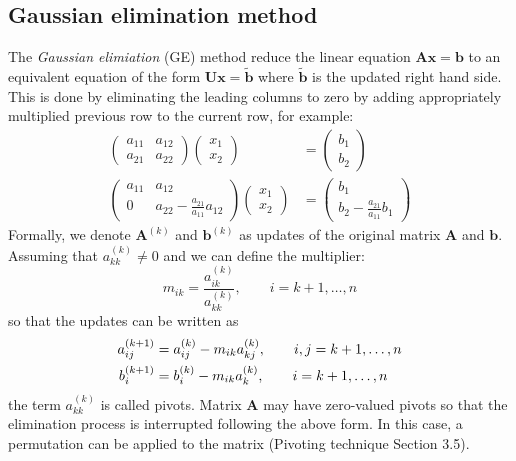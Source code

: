 \documentclass{article}
\begin{document}
\subsection{Gaussian elimination method}
The \emph{Gaussian elimiation} (GE) method reduce the linear equation 
$\mathbf{A}\mathbf{x} = \mathbf{b}$ to an equivalent equation 
of the form $\mathbf{U}\mathbf{x} = \tilde{\mathbf{b}}$ where $\tilde{\mathbf{b}}$
is the updated right hand side. 
This is done by eliminating the leading columns to zero by adding appropriately multiplied 
previous row to the current row, for example:
\begin{align*}
    \left(\begin{matrix}
        a_{11} & a_{12} \\
        a_{21} & a_{22} 
    \end{matrix}\right)
    \left(\begin{matrix}
        x_1 \\ x_2
    \end{matrix}\right) &= 
    \left(\begin{matrix}
        b_1 \\ b_2
    \end{matrix}\right) \\
    \left(\begin{matrix}
        a_{11} & a_{12} \\
        0 & a_{22} - \frac{a_{21}}{a_{11}} a_{12}
    \end{matrix}\right)
    \left(\begin{matrix}
        x_1 \\ x_2
    \end{matrix}\right) &= 
    \left(\begin{matrix}
        b_1 \\ b_2 - \frac{a_{21}}{a_{11}} b_1
    \end{matrix}\right)
\end{align*}
Formally, we denote $\mathbf{A}^{(k)}$ and $\mathbf{b}^{(k)}$ as updates of the 
original matrix $\mathbf{A}$ and $\mathbf{b}$. Assuming that $a_{kk}^{(k)}\neq 0$ and 
we can define the multiplier:
\begin{equation*}
    m_{ik} = \frac{a_{ik}^{(k)}}{a_{kk}^{(k)}} 
    ,\qquad i = k+1, \dots, n
\end{equation*}
so that the updates can be written as
\begin{align}
    a_{ij}^{(k+1)} &= a_{ij}^{(k)} - m_{ik}a_{kj}^{(k)}
    ,\qquad i,j = k+1, \dots, n \notag \\
    b_{i}^{(k+1)} &= b_{i}^{(k)} - m_{ik}a_{k}^{(k)}
    ,\qquad i = k+1, \dots, n \\
\end{align}
the term $a_{kk}^{(k)}$ is called pivots. Matrix $\mathbf{A}$ may have zero-valued pivots so 
that the elimination process is interrupted following the above form. In this case, a 
permutation can be applied to the matrix (Pivoting technique Section 3.5).
\end{document}
